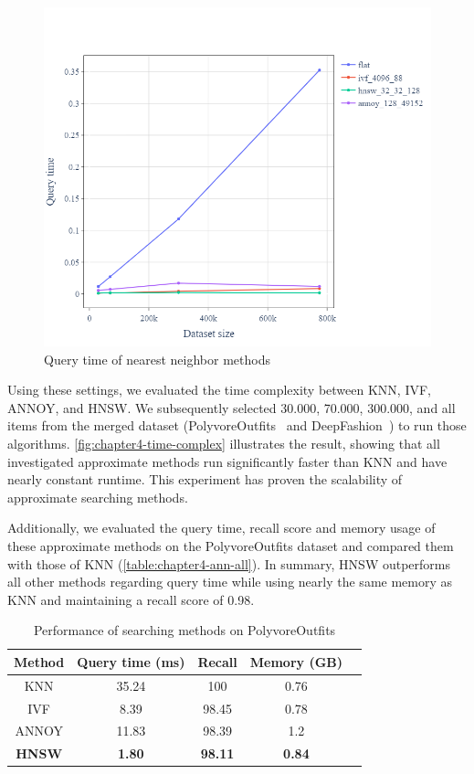 \begin{figure}[h!]
    \centering
\includegraphics[width=\linewidth]{content/resources/images/fashion-recommendation/chapter4-time-complex.png}
    \caption{Query time of nearest neighbor methods}
    \label{fig:chapter4-time-complex}
\end{figure}

Using these settings, we evaluated the time complexity between KNN, IVF, ANNOY, and HNSW. We subsequently selected 30.000, 70.000, 300.000, and all items from the merged dataset (PolyvoreOutfits~\cite{Mariya-ECCV18-Learning} and DeepFashion~\cite{Liu-CVPR2016-DeepFashion}) to run those algorithms. \autoref{fig:chapter4-time-complex} illustrates the result, showing that all investigated approximate methods run significantly faster than KNN and have nearly constant runtime. This experiment has proven the scalability of approximate searching methods. 

Additionally, we evaluated the query time, recall score and memory usage of these approximate methods on the PolyvoreOutfits dataset and compared them with those of KNN (\autoref{table:chapter4-ann-all}). In summary, HNSW outperforms all other methods regarding query time while using nearly the same memory as KNN and maintaining a recall score of 0.98.



\begin{table}[h!]
\centering
\begin{tabular}{c c c c c}
\hline
Method & Query time (ms) & Recall & Memory (GB) \\ \hline
KNN & 35.24 & 100  & 0.76 \\
IVF & 8.39 & 98.45 & 0.78 \\
ANNOY & 11.83 & 98.39 & 1.2 \\
\textbf{HNSW} & \textbf{1.80} & \textbf{98.11} & \textbf{0.84}
\\ \hline
\end{tabular}
\caption{Performance of searching methods on PolyvoreOutfits}
\label{table:chapter4-ann-all}
\end{table}
